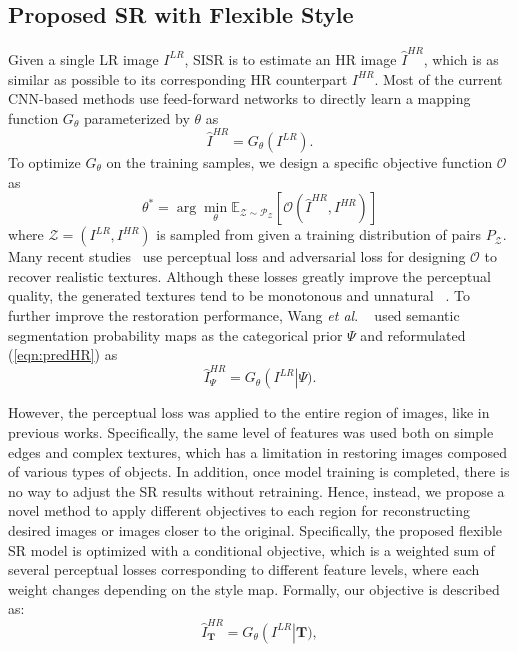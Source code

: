 \documentclass{article}
\newcommand{\etal}{\textit{et al}. }
\begin{document}
\subsection{Proposed SR with Flexible Style}
Given a single LR image ${I}^{LR}$, SISR is to estimate an HR image $\hat{I}^{HR}$, which is as similar as possible to its corresponding HR counterpart ${I}^{HR}$. Most of the current CNN-based methods use feed-forward networks to directly learn a mapping function ${G}_{\theta}$ parameterized by ${\theta}$ as
\begin{equation}
\hat{I}^{HR}={G}_{\theta}\left({I}^{LR}\right).
\label{eqn:predHR}
\end{equation}
To optimize ${G}_{\theta}$ on the training samples, we design a specific objective function $\mathcal{O}$ as
\begin{equation}
{\theta}^\ast=\arg\min_{\theta}\mathbb{E}_{\mathcal{Z}\sim\mathcal{P}_{\mathcal{Z}}}\left[\mathcal{O}\left(\hat{I}^{HR},{I}^{HR}\right)\right]
\label{eqn:optTheta}
\end{equation}
where $\mathcal{Z}=\left({I}^{LR},{I}^{HR}\right)$ is sampled from given a training distribution of pairs $P_{\mathcal{Z}}$. Many recent studies~\cite{2017photo, sajjadi2017enhancenet} use perceptual loss and adversarial loss for designing $\mathcal{O}$ to recover realistic textures. Although these losses greatly improve the perceptual quality, the generated textures tend to be monotonous and unnatural ~\cite{rad2019srobb, 2018recovering}. To further improve the restoration performance, Wang \etal~\cite{2018recovering} used semantic segmentation probability maps as the categorical prior $\Psi$ and reformulated (\ref{eqn:predHR}) as
\begin{equation}
\hat{I}_{\Psi}^{HR}=G_{\theta}\left({I}^{LR}\right|\Psi ).
\label{eqn:predHRwPsi}
\end{equation}



However, the perceptual loss was applied to the entire region of images, like in previous works. Specifically, the same level of features was used both on simple edges and complex textures, which has a limitation in restoring images composed of various types of objects.
In addition, once model training is completed, there is no way to adjust the SR results without retraining. Hence, instead, we propose a novel method to apply different objectives to each region for reconstructing desired images or images closer to the original. Specifically, the proposed flexible SR model is optimized with a conditional objective, which is a weighted sum of several perceptual losses corresponding to different feature levels, where each weight changes depending on the style map. 
Formally, our objective is described as:
\begin{equation}
\hat{I}_\mathbf{T}^{HR}={G}_{\theta}\left({I}^{LR}\right|\mathbf{T}),
\label{eqn:predHRwT}
\end{equation}
\end{document}
